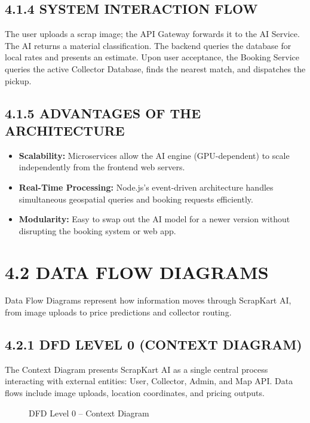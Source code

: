 \subsection{4.1.4 SYSTEM INTERACTION FLOW}
The user uploads a scrap image; the API Gateway forwards it to the AI Service. The AI returns a material classification. The backend queries the database for local rates and presents an estimate. Upon user acceptance, the Booking Service queries the active Collector Database, finds the nearest match, and dispatches the pickup.

\subsection{4.1.5 ADVANTAGES OF THE ARCHITECTURE}
\begin{itemize}
    \item \textbf{Scalability:} Microservices allow the AI engine (GPU-dependent) to scale independently from the frontend web servers.
    \item \textbf{Real-Time Processing:} Node.js’s event-driven architecture handles simultaneous geospatial queries and booking requests efficiently.
    \item \textbf{Modularity:} Easy to swap out the AI model for a newer version without disrupting the booking system or web app.
\end{itemize}

\section{4.2 DATA FLOW DIAGRAMS}
Data Flow Diagrams represent how information moves through ScrapKart AI, from image uploads to price predictions and collector routing.

\subsection{4.2.1 DFD LEVEL 0 (CONTEXT DIAGRAM)}
The Context Diagram presents ScrapKart AI as a single central process interacting with external entities: User, Collector, Admin, and Map API. Data flows include image uploads, location coordinates, and pricing outputs.
\begin{figure}[H]
    \centering
    \vspace{4cm}
    \caption{DFD Level 0 – Context Diagram}
\end{figure}

